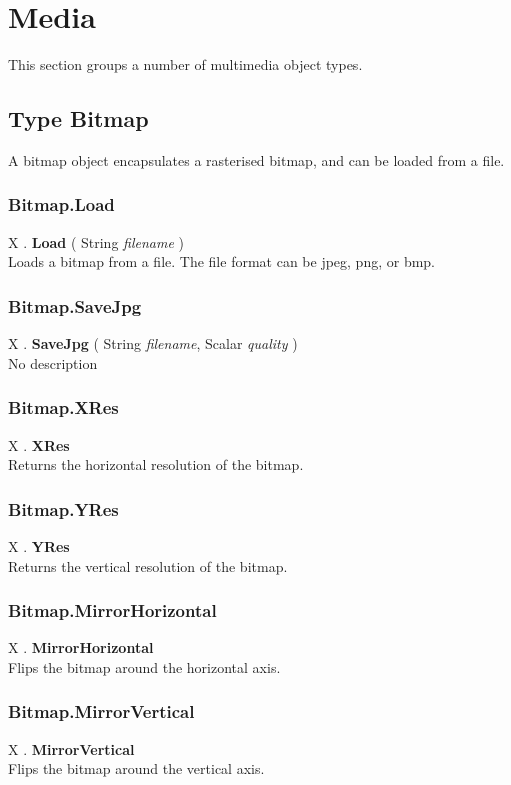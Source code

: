 \documentclass[10pt]{book}
\begin{document}
\section{Media \label{Media}}
This section groups a number of multimedia object types.

\subsection{Type Bitmap \label{T:Bitmap}}
A bitmap object encapsulates a rasterised bitmap, and can be loaded from a file.

\subsubsection{Bitmap.Load \label{F:Bitmap:Load}}
X . \textbf{Load} ( String \textit{filename} ) \\
Loads a bitmap from a file. The file format can be jpeg, png, or bmp.

\subsubsection{Bitmap.SaveJpg \label{F:Bitmap:SaveJpg}}
X . \textbf{SaveJpg} ( String \textit{filename}, Scalar \textit{quality} ) \\
No description

\subsubsection{Bitmap.XRes \label{F:Bitmap:XRes}}
X . \textbf{XRes} \\
Returns the horizontal resolution of the bitmap.

\subsubsection{Bitmap.YRes \label{F:Bitmap:YRes}}
X . \textbf{YRes} \\
Returns the vertical resolution of the bitmap.


\subsubsection{Bitmap.MirrorHorizontal \label{F:Bitmap:MirrorHorizontal}}
X . \textbf{MirrorHorizontal} \\
Flips the bitmap around the horizontal axis.

\subsubsection{Bitmap.MirrorVertical \label{F:Bitmap:MirrorVertical}}
X . \textbf{MirrorVertical} \\
Flips the bitmap around the vertical axis.
\end{document}
